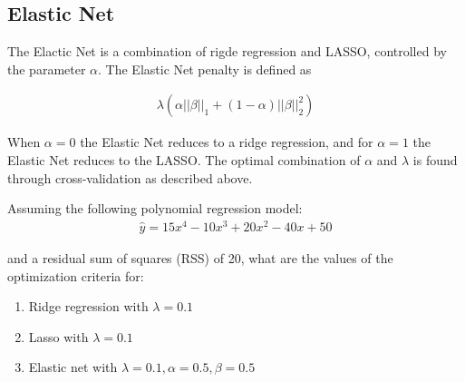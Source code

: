 \subsection{Elastic Net}

The Elactic Net is a combination of rigde regression and LASSO, controlled by the parameter $\alpha$. The Elastic Net penalty is defined as

\begin{align*}
\lambda \left( \alpha ||\beta||_1  + (1-\alpha)||\beta||_2^2 \right)
\end{align*}

When $\alpha=0$ the Elastic Net reduces to a ridge regression, and for $\alpha=1$ the Elastic Net reduces to the LASSO. The optimal combination of $\alpha$ and $\lambda$ is found through cross-validation as described above.

\begin{exerciseboxpaper}
Assuming the following polynomial regression model:
\begin{align*}
\hat{y} = 15 x^4 - 10 x^3 + 20 x^2 - 40 x + 50
\end{align*}

and a residual sum of squares (RSS) of 20, what are the values of the optimization criteria for: 
\begin{enumerate}
   \item Ridge regression with $\lambda=0.1$
   \item Lasso with $\lambda=0.1$
   \item Elastic net with $\lambda=0.1, \alpha=0.5, \beta=0.5$
\end{enumerate}
\end{exerciseboxpaper}

